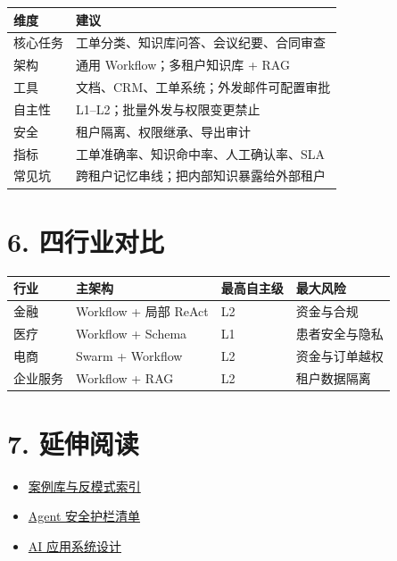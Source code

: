 \documentclass[9pt,a4paper,twocolumn]{ctexart}
\begin{document}
{\footnotesize
\begin{tabular}{|p{}|p{}|}
\hline
\textbf{维度} & \textbf{建议} \\
\hline
核心任务 & 工单分类、知识库问答、会议纪要、合同审查 \\
\hline
架构 & 通用 Workflow；多租户知识库 + RAG \\
\hline
工具 & 文档、CRM、工单系统；外发邮件可配置审批 \\
\hline
自主性 & L1–L2；批量外发与权限变更禁止 \\
\hline
安全 & 租户隔离、权限继承、导出审计 \\
\hline
指标 & 工单准确率、知识命中率、人工确认率、SLA \\
\hline
常见坑 & 跨租户记忆串线；把内部知识暴露给外部租户 \\
\hline
\end{tabular}
}



\section*{6. 四行业对比}

{\footnotesize
\begin{tabular}{|p{}|p{}|p{}|p{}|}
\hline
\textbf{行业} & \textbf{主架构} & \textbf{最高自主级} & \textbf{最大风险} \\
\hline
金融 & Workflow + 局部 ReAct & L2 & 资金与合规 \\
\hline
医疗 & Workflow + Schema & L1 & 患者安全与隐私 \\
\hline
电商 & Swarm + Workflow & L2 & 资金与订单越权 \\
\hline
企业服务 & Workflow + RAG & L2 & 租户数据隔离 \\
\hline
\end{tabular}
}



\section*{7. 延伸阅读}

\begin{itemize}[itemsep=1pt, topsep=2pt]
  \item \href{01-案例库与反模式索引.md}{案例库与反模式索引}
  \item \href{../06-安全与治理/01-Agent安全护栏清单.md}{Agent 安全护栏清单}
  \item \href{../07-系统设计/01-AI应用系统设计.md}{AI 应用系统设计}
\end{itemize}
\end{document}
